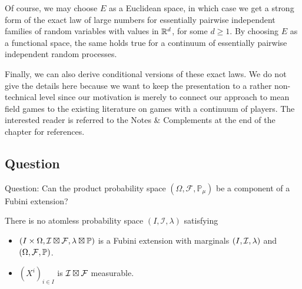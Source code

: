 Of course, we may choose $E$ as a Euclidean space, in which case we get a strong form of the exact law of large numbers for essentially pairwise independent families of random variables with values in $\mathbb{R}^d$, for some $d \geq 1$. By choosing $E$ as a functional space, the same holds true for a continuum of essentially pairwise independent random processes.

Finally, we can also derive conditional versions of these exact laws. We do not give the details here because we want to keep the presentation to a rather non-technical level since our motivation is merely to connect our approach to mean field games to the existing literature on games with a continuum of players. The interested reader is referred to the Notes \& Complements at the end of the chapter for references.


\subsection{Question}

Question: Can the product probability space $(\Omega, \mathcal{F}, \mathbb{P}_\mu)$ be a component of a Fubini extension?

\begin{proposition}
	There is no atomless probability space $(I, \mathcal{I}, \lambda)$ satisfying
	\begin{itemize}
		\item $(I \times \Omega, {\cal I} \boxtimes {\cal F}, \lambda \boxtimes \mathbb{P} )$ is a Fubini extension with marginals $(I, {\cal I}, \lambda)$ and $(\Omega, {\cal F}, \mathbb{P})$.
		\item $(X^i)_{i \in I}$ is ${\cal I} \boxtimes {\cal F}$ measurable.
	\end{itemize}
\end{proposition}

